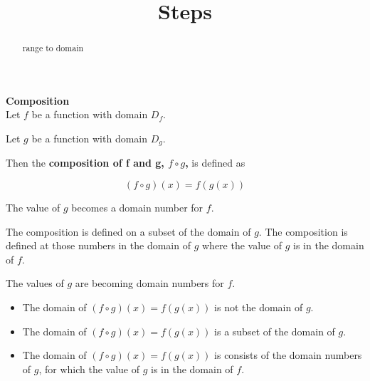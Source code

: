 \documentclass{ximera}
\title{Steps}
\begin{document}
\begin{abstract}
range to domain
\end{abstract}
\maketitle







\begin{template} \textbf{\textcolor{blue!55!black}{Composition}}  \\


Let $f$ be a function with domain $D_f$.


Let $g$ be a function with domain $D_g$.




Then the \textbf{\textcolor{green!50!black}{composition of f and g, $f \circ g$,}} is defined as

\[
(f \circ g)(x) = f(g(x))
\] 


The value of $g$ becomes a domain number for $f$.


The composition is defined on a subset of the domain of $g$.  The composition is defined at those numbers in the domain of $g$ where the value of $g$ is in the domain of $f$.




\end{template}

The values of $g$ are becoming domain numbers for $f$. \\



\begin{warning}

\begin{itemize}
\item The domain of $(f \circ g)(x) = f(g(x))$ is not the domain of $g$.
\item The domain of $(f \circ g)(x) = f(g(x))$ is a subset of the domain of $g$.
\item The domain of $(f \circ g)(x) = f(g(x))$ is consists of the domain numbers of $g$, for which the value of $g$ is in the domain of $f$.
\end{itemize}

\end{warning}
\end{document}
